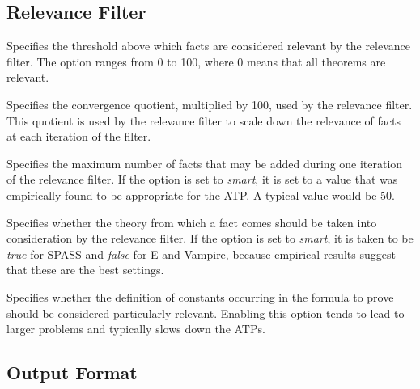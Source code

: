 \documentclass[a4paper,12pt]{article}
\begin{document}
\subsection{Relevance Filter}
\label{relevance-filter}

\begin{enum}
Specifies the threshold above which facts are considered relevant by the
relevance filter. The option ranges from 0 to 100, where 0 means that all
theorems are relevant.

Specifies the convergence quotient, multiplied by 100, used by the relevance
filter. This quotient is used by the relevance filter to scale down the
relevance of facts at each iteration of the filter.

Specifies the maximum number of facts that may be added during one iteration of
the relevance filter. If the option is set to \textit{smart}, it is set to a
value that was empirically found to be appropriate for the ATP. A typical value
would be 50.

Specifies whether the theory from which a fact comes should be taken into
consideration by the relevance filter. If the option is set to \textit{smart},
it is taken to be \textit{true} for SPASS and \textit{false} for E and Vampire,
because empirical results suggest that these are the best settings.

Specifies whether the definition of constants occurring in the formula to prove
should be considered particularly relevant. Enabling this option tends to lead
to larger problems and typically slows down the ATPs.

\end{enum}

\subsection{Output Format}
\label{output-format}
\end{document}
